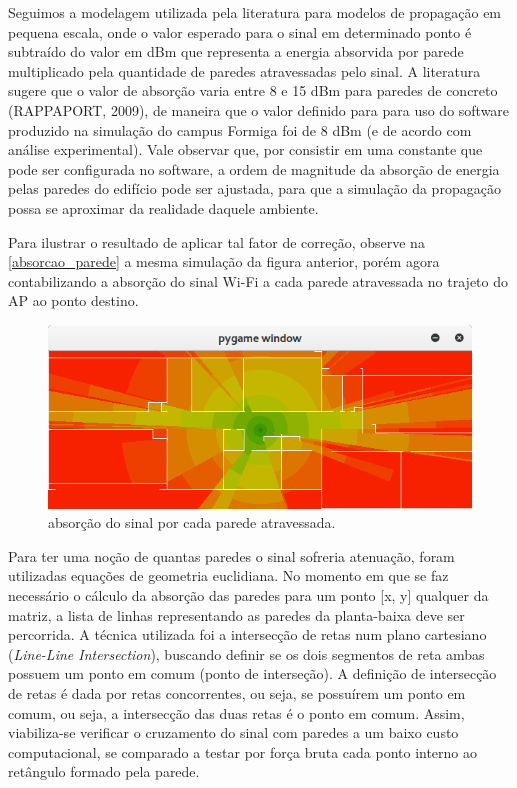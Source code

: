 \documentclass[
	12pt,				%
	openright,			%
	twoside,			%
	a4paper,			%
	english,			%
	french,				%
	spanish,			%
	brazil				%
	]{abntex2}
\begin{document}
Seguimos a modelagem utilizada pela literatura para modelos de propagação em pequena escala, onde o valor esperado para o sinal em determinado ponto é subtraído do valor em dBm que representa a energia absorvida por parede multiplicado pela quantidade de paredes atravessadas pelo sinal. A literatura sugere que o valor de absorção varia entre 8 e 15 dBm para paredes de concreto (RAPPAPORT, 2009), de maneira que o valor definido para para uso do software produzido na simulação do campus Formiga foi de 8 dBm (e de acordo com análise experimental). Vale observar que, por consistir em uma constante que pode ser configurada no software, a ordem de magnitude da absorção de energia pelas paredes do edifício pode ser ajustada, para que a simulação da propagação possa se aproximar da realidade daquele ambiente. 

Para ilustrar o resultado de aplicar tal fator de correção, observe na \autoref{absorcao_parede} a mesma simulação da figura anterior, porém agora contabilizando a absorção do sinal Wi-Fi a cada parede atravessada no trajeto do AP ao ponto destino. 

\begin{figure}[ht]
	\caption{\label{absorcao_parede}absorção do sinal por cada parede atravessada.}
	\begin{center}
		\includegraphics[scale=0.7]{images/absorcao-parede.jpg}
	\end{center}
\end{figure}

Para ter uma noção de quantas paredes o sinal sofreria atenuação, foram utilizadas equações de geometria euclidiana. No momento em que se faz necessário o cálculo da absorção das paredes para um ponto [x, y] qualquer da matriz, a lista de linhas representando as paredes da planta-baixa deve ser percorrida. A técnica utilizada foi a intersecção de retas num plano cartesiano (\textit{Line-Line Intersection}), buscando definir se os dois segmentos de reta ambas possuem um ponto em comum (ponto de interseção). A definição de intersecção de retas é dada por retas concorrentes, ou seja, se possuírem um ponto em comum, ou seja, a intersecção das duas retas é o ponto em comum. Assim, viabiliza-se verificar o cruzamento do sinal com paredes a um baixo custo computacional, se comparado a testar por força bruta cada ponto interno ao retângulo formado pela parede. 
\end{document}
